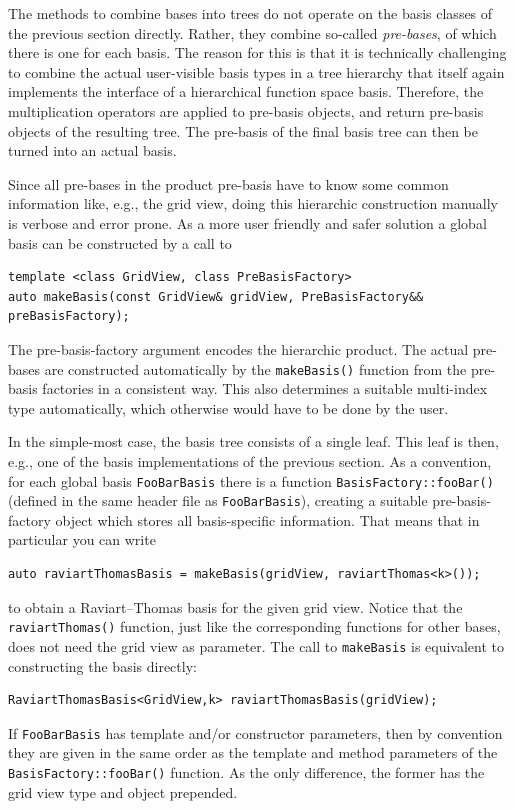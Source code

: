 \documentclass[a4paper,10pt,headings=normal,bibliography=totoc]{scrartcl}
\newcommand{\cpp}[1]{\lstinline[basicstyle=\ttfamily]!#1!}
\begin{document}
The methods to combine bases into trees do not operate on the basis classes of the previous section
directly.  Rather, they combine so-called \emph{pre-bases}, of which there is one for each basis.
The reason for this is
that it is technically challenging to combine the actual user-visible basis types in a
tree hierarchy that itself again implements the interface of a hierarchical function space basis.
Therefore, the multiplication operators are applied to pre-basis objects, and return pre-basis
objects of the resulting tree.
The pre-basis of the final basis tree can then be turned into an actual basis.

Since all pre-bases in the product pre-basis have to know some common information
like, e.g., the grid view, doing this hierarchic construction
manually is verbose and error prone. As a more user friendly and safer solution
a global basis can be constructed by a call to
\begin{lstlisting}[style=Interface]
template <class GridView, class PreBasisFactory>
auto makeBasis(const GridView& gridView, PreBasisFactory&& preBasisFactory);
\end{lstlisting}
The pre-basis-factory argument encodes the hierarchic product.
The actual pre-bases are constructed automatically by the
\cpp{makeBasis()} function from the pre-basis factories in a consistent way.
This also determines a suitable multi-index type automatically,
which otherwise would have to be done by the user.

In the simple-most case, the basis tree consists of a single leaf.
This leaf is then, e.g., one of the basis implementations of the previous section.
As a convention, for each global basis
\cpp{FooBarBasis} there is a function \cpp{BasisFactory::fooBar()}
(defined in the same header file as \cpp{FooBarBasis}),
creating a suitable pre-basis-factory object which
stores all basis-specific information.
That means that in particular you can write
\begin{lstlisting}[style=Example]
auto raviartThomasBasis = makeBasis(gridView, raviartThomas<k>());
\end{lstlisting}
to obtain a Raviart--Thomas basis for the given grid view.
Notice that the \cpp{raviartThomas()} function, just like the corresponding functions for other bases, does not need
the grid view as parameter.
The call to \cpp{makeBasis} is equivalent to constructing
the basis directly:
\begin{lstlisting}[style=Example]
RaviartThomasBasis<GridView,k> raviartThomasBasis(gridView);
\end{lstlisting}
If \cpp{FooBarBasis} has template and/or constructor parameters, then by convention they
are given in the same order as the template and method
parameters of the \cpp{BasisFactory::fooBar()} function.
As the only difference, the former has the grid view type and object prepended.
\end{document}
